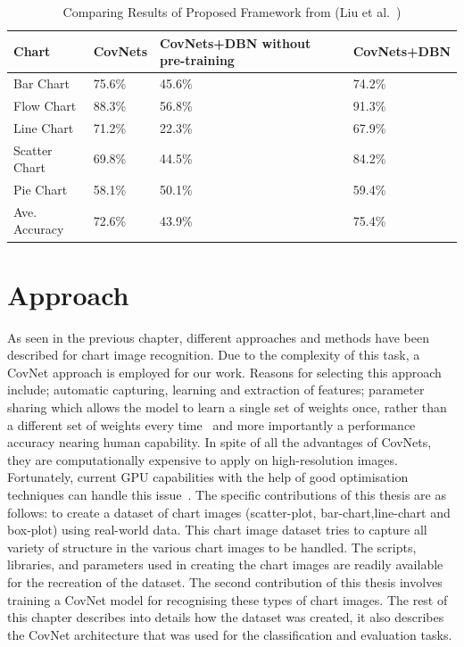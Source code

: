 \documentclass[12pt, a4paper,oneside]{report}
\begin{document}
\begin{table}[h]
	\centering {} \small
	\begin{tabular}{|p{3cm}|p{3cm}|p{3cm}|p{3cm}|}
		
		\hline
		Chart & CovNets&CovNets+DBN without pre-training & CovNets+DBN \\ \hline
				
		Bar Chart & 75.6\% & 45.6\% & 74.2\% \\ \hline
		Flow Chart & 88.3\%  & 56.8\% & 91.3\%  \\ \hline
		Line Chart  & 71.2\%  & 22.3\% & 67.9\% \\ \hline
	
		Scatter Chart & 69.8\% & 44.5\% & 84.2\% \\ \hline
		Pie Chart & 58.1\%  & 50.1\% & 59.4\%    \\ \hline
		Ave. Accuracy & 72.6\%  & 43.9\% & 75.4\% \\ \hline
		
	\end{tabular}
	\caption {Comparing Results of Proposed Framework from (Liu et al.~\cite{liu2015chart}) }	
	\label{table:deep}
	
\end{table}


\chapter{Approach}
As seen in the previous chapter, different approaches and methods have been described for chart image recognition. Due to the complexity of this task, a CovNet approach is employed for our work. Reasons for selecting this approach include; automatic capturing, learning and extraction of features; parameter sharing which allows the model to learn a single set of weights once, rather than a different set of weights every time~\cite{Rodriguez} and more importantly a performance accuracy nearing human capability. In spite of all the advantages of CovNets, they are computationally expensive to apply on high-resolution images. Fortunately, current GPU capabilities with the help of good optimisation techniques can handle this issue~\cite{krizhevsky2012imagenet}. \newline\newline
The specific contributions of this thesis are as follows: to create a dataset of chart images (scatter-plot, bar-chart,line-chart and box-plot) using real-world data. This chart image dataset tries to capture all variety of structure in the various chart images to be handled. The scripts, libraries, and parameters used in creating the chart images are readily available for the recreation of the dataset. The second contribution of this thesis involves training a CovNet model for recognising these types of chart images.\newline
The rest of this chapter describes into details how the dataset was created, it also describes the CovNet architecture that was used for the classification and evaluation tasks.
\end{document}
